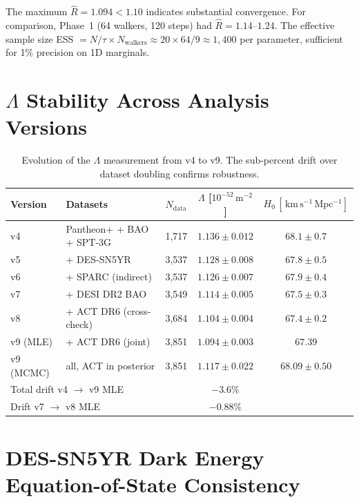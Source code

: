 \documentclass[12pt,a4paper]{article}
\newcommand{\kms}{\,\mathrm{km\,s^{-1}\,Mpc^{-1}}}
\newcommand{\msq}{\,\mathrm{m}^{-2}}
\begin{document}
The maximum $\hat{R} = 1.094 < 1.10$ indicates substantial convergence.
For comparison, Phase~1 (64 walkers, 120 steps) had $\hat{R} = 1.14$--$1.24$.
The effective sample size ESS $= N/\tau \times N_\mathrm{walkers} \approx 20 \times 64 / 9 \approx 1{,}400$ per parameter, sufficient for 1\% precision on 1D marginals.

\section{$\Lambda$ Stability Across Analysis Versions}
\label{sec:stability}

\begin{table}[h]
\centering
\caption{Evolution of the $\Lambda$ measurement from v4 to v9.
The sub-percent drift over dataset doubling confirms robustness.}
\label{tab:versions}
\begin{tabular}{@{}lllcc@{}}
\toprule
Version & Datasets & $N_\mathrm{data}$ & $\Lambda$ [$10^{-52}\msq$] & $H_0\,[\kms]$ \\
\midrule
v4 & Pantheon+ + BAO + SPT-3G & 1,717 & $1.136 \pm 0.012$ & $68.1 \pm 0.7$ \\
v5 & + DES-SN5YR & 3,537 & $1.128 \pm 0.008$ & $67.8 \pm 0.5$ \\
v6 & + SPARC (indirect) & 3,537 & $1.126 \pm 0.007$ & $67.9 \pm 0.4$ \\
v7 & + DESI DR2 BAO & 3,549 & $1.114 \pm 0.005$ & $67.5 \pm 0.3$ \\
v8 & + ACT DR6 (cross-check) & 3,684 & $1.104 \pm 0.004$ & $67.4 \pm 0.2$ \\
v9 (MLE) & + ACT DR6 (joint) & 3,851 & $1.094 \pm 0.003$ & $67.39$ \\
v9 (MCMC) & all, ACT in posterior & 3,851 & $1.117 \pm 0.022$ & $68.09 \pm 0.50$ \\
\midrule
\multicolumn{3}{l}{Total drift v4 $\to$ v9 MLE} & $-3.6\%$ & \\
\multicolumn{3}{l}{Drift v7 $\to$ v8 MLE} & $-0.88\%$ & \\
\bottomrule
\end{tabular}
\end{table}

\section{DES-SN5YR Dark Energy Equation-of-State Consistency}
\label{sec:w0wa}
\end{document}
